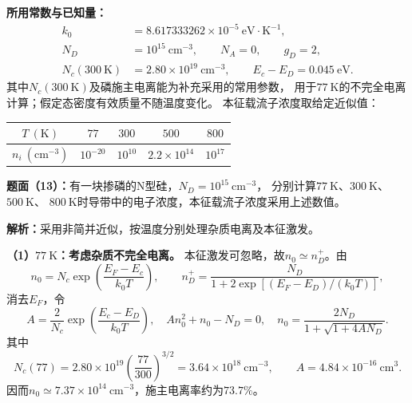 \begin{problem}
    \textbf{所用常数与已知量：}
    \[
    \begin{aligned}
        k_0&=8.617333262\times10^{-5}\ \mathrm{eV\cdot K^{-1}},\\
        N_D&=10^{15}\ \mathrm{cm}^{-3},\qquad N_A=0,\qquad g_D=2,\\
        N_c(300\ \mathrm{K})&=2.80\times10^{19}\ \mathrm{cm}^{-3},
        \qquad E_c-E_D=0.045\ \mathrm{eV}.
    \end{aligned}
    \]
    其中$N_c(300\ \mathrm{K})$及磷施主电离能为补充采用的常用参数，
    用于$77\ \mathrm{K}$的不完全电离计算；假定态密度有效质量不随温度变化。
    本征载流子浓度取给定近似值：
    \begin{center}
        \begin{tabular}{c c c c c}
            \hline
            $T\ (\mathrm{K})$ & $77$ & $300$ & $500$ & $800$ \\
            \hline
            $n_i\ (\mathrm{cm}^{-3})$ & $10^{-20}$ & $10^{10}$ & $2.2\times10^{14}$ & $10^{17}$ \\
            \hline
        \end{tabular}
    \end{center}

    \textbf{题面（13）：}有一块掺磷的N型硅，$N_D=10^{15}\ \mathrm{cm}^{-3}$，
    分别计算$77\ \mathrm{K}$、$300\ \mathrm{K}$、$500\ \mathrm{K}$、
    $800\ \mathrm{K}$时导带中的电子浓度，本征载流子浓度采用上述数值。

    \textbf{解析：}采用非简并近似，按温度分别处理杂质电离及本征激发。

    \textbf{（1）$77\ \mathrm{K}$：考虑杂质不完全电离。}
    本征激发可忽略，故$n_0\simeq n_D^+$。由
    \[
    n_0=N_c\exp\!\left(\frac{E_F-E_c}{k_0T}\right),\qquad
    n_D^+=\frac{N_D}{1+2\exp[(E_F-E_D)/(k_0T)]},
    \]
    消去$E_F$，令
    \[
    A=\frac{2}{N_c}\exp\!\left(\frac{E_c-E_D}{k_0T}\right),
    \quad An_0^2+n_0-N_D=0,
    \quad n_0=\frac{2N_D}{1+\sqrt{1+4AN_D}}.
    \]
    其中
    \[
    N_c(77)=2.80\times10^{19}\left(\frac{77}{300}\right)^{3/2}
    =3.64\times10^{18}\ \mathrm{cm}^{-3},\qquad
    A=4.84\times10^{-16}\ \mathrm{cm}^{3}.
    \]
    因而$n_0\simeq7.37\times10^{14}\ \mathrm{cm}^{-3}$，施主电离率约为$73.7\%$。


\end{problem}

